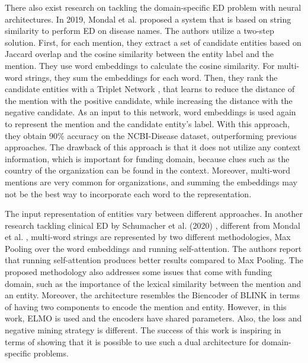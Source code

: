 \documentclass{report}
\theoremstyle{definition}
\theoremstyle{remark}
\begin{document}
There also exist research on tackling the domain-specific ED problem with neural architectures. In 2019, Mondal et al. \cite{MedicalTriplet} proposed a system that is based on string similarity to perform ED on disease names. The authors utilize a two-step solution. First, for each mention, they extract a set of candidate entities based on Jaccard overlap and the cosine similarity between the entity label and the mention. They use word embeddings to calculate the cosine similarity. For multi-word strings, they sum the embeddings for each word. Then, they rank the candidate entities with a Triplet Network \cite{tripletNetwork}, that learns to reduce the distance of the mention with the positive candidate, while increasing the distance with the negative candidate. As an input to this network, word embeddings is used again to represent the mention and the candidate entity's label. With this approach, they obtain 90\% accuracy on the NCBI-Disease dataset, outperforming previous approaches. The drawback of this approach is that it does not utilize any context information, which is important for funding domain, because clues such as the country of the organization can be found in the context. Moreover, multi-word mentions are very common for organizations, and summing the embeddings may not be the best way to incorporate each word to the representation.

The input representation of entities vary between different approaches. In another research tackling clinical ED by Schumacher et al. (2020) \cite{ClinicalConcept}, different from Mondal et al. \cite{MedicalTriplet},  multi-word strings are represented by two different methodologies, Max Pooling over the word embeddings and running self-attention. The authors report that running self-attention produces better results compared to Max Pooling. The proposed methodology also addresses some issues that come with funding domain, such as the importance of the lexical similarity between the mention and an entity. Moreover, the architecture resembles the Biencoder of BLINK in terms of having two components to encode the mention and entity. However, in this work, ELMO \cite{elmo} is used and the encoders have shared parameters. Also, the loss and negative mining strategy is different. The success of this work is inspiring in terms of showing that it is possible to use such a dual architecture for domain-specific problems. 
\end{document}
